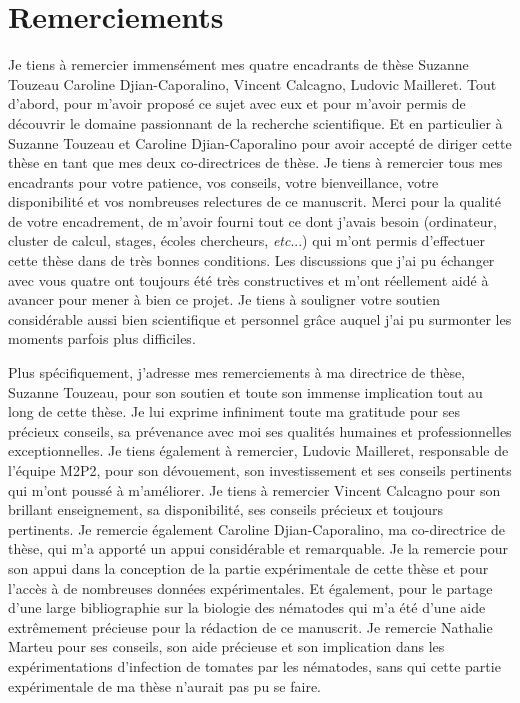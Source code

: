


\chapter*{Remerciements}
Je tiens à remercier immensément  mes quatre encadrants de thèse Suzanne Touzeau
Caroline Djian-Caporalino, Vincent Calcagno, Ludovic Mailleret. Tout d’abord, pour m’avoir proposé ce sujet avec eux et pour m'avoir permis de découvrir le domaine passionnant de la recherche scientifique. Et en particulier à Suzanne Touzeau et Caroline Djian-Caporalino pour avoir  accepté de  diriger cette thèse en tant que mes deux co-directrices de  thèse. Je tiens à remercier tous mes encadrants  pour votre patience, vos conseils, votre bienveillance, votre disponibilité et vos nombreuses relectures de ce manuscrit. Merci
pour la qualité  de votre encadrement, de m'avoir fourni tout ce dont j'avais besoin (ordinateur, cluster de calcul, stages, écoles chercheurs, \textit{etc}...) qui m’ont permis d'effectuer cette thèse dans de très bonnes conditions. Les discussions que j'ai pu échanger  avec vous quatre ont toujours
été très constructives  et m’ont réellement aidé à avancer pour mener à bien ce projet. Je tiens  à souligner
votre soutien considérable aussi bien scientifique et personnel  grâce auquel j’ai pu surmonter les moments parfois plus difficiles.

Plus spécifiquement, j’adresse mes remerciements à ma directrice de thèse, Suzanne Touzeau, pour son soutien et  toute son immense implication tout au long de cette thèse.  Je lui exprime infiniment toute ma gratitude pour ses
précieux conseils, sa prévenance avec moi  ses qualités humaines et professionnelles exceptionnelles.
Je tiens également à remercier, Ludovic Mailleret, responsable de l’équipe M2P2, pour son dévouement, son investissement et ses conseils pertinents qui m'ont poussé à m'améliorer.
Je tiens à remercier Vincent Calcagno pour son brillant enseignement, sa disponibilité, ses conseils précieux et toujours pertinents.  
Je remercie également Caroline Djian-Caporalino, ma co-directrice de thèse, qui m’a apporté un appui considérable et remarquable. Je la remercie pour son appui dans la conception de la partie expérimentale de cette thèse et pour l'accès à de nombreuses données expérimentales. Et également,  pour le partage d'une large  bibliographie sur la biologie des nématodes qui m'a été d'une aide  extrêmement précieuse pour  la rédaction de ce manuscrit.
Je remercie Nathalie Marteu pour ses conseils, son aide précieuse et son implication dans les expérimentations d'infection de tomates par les nématodes, sans qui cette partie expérimentale de ma thèse n’aurait pas pu se faire.

